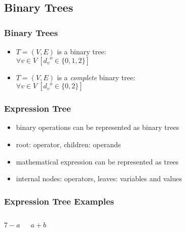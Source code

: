 \documentclass[dvipsnames]{beamer}
\begin{document}
\subsection{Binary Trees}

\begin{frame}
  \frametitle{Binary Trees}

  \begin{itemize}
    \item $T=(V,E)$ is a \alert{binary tree}:\\
      $\forall v \in V~[{d_v}^o \in \{0,1,2\}]$
  \end{itemize}

  \begin{itemize}
    \item $T=(V,E)$ is a \emph{complete} binary tree:\\
      $\forall v \in V~[{d_v}^o \in \{0,2\}]$
  \end{itemize}

\end{frame}

\begin{frame}
  \frametitle{Expression Tree}

  \begin{itemize}
    \item binary operations can be represented as binary trees
    \item root: operator, children: operands

    \medskip
    \item mathematical expression can be represented as trees
    \item internal nodes: operators, leaves: variables and values
  \end{itemize}
\end{frame}

\begin{frame}
  \frametitle{Expression Tree Examples}

  \vspace{-24pt}
  \begin{columns}[t]
    \begin{center}
      \[ 7-a \]

      \medskip
    \end{center}

    \begin{center}
      \[ a+b \]

      \medskip
    \end{center}
  \end{columns}
\end{frame}
\end{document}
